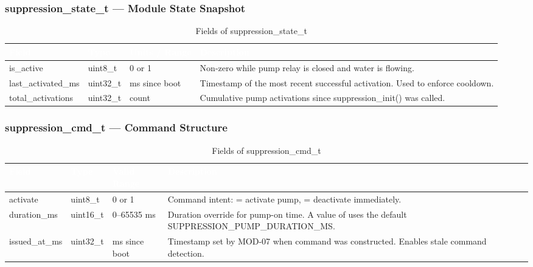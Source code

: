 \documentclass[12pt,a4paper]{article}
\newcommand{\theadtext}[1]{\textcolor{white}{\textbf{#1}}}
\newcommand{\fn}[1]{{\footnotesize\ttfamily #1}}
\begin{document}
\subsubsection{\fn{suppression\_state\_t} --- Module State Snapshot}

\begin{table}[H]
\centering\small
\begin{tabularx}{\textwidth}{L{3.5cm} L{2.5cm} L{2.5cm} X}
\toprule
{}
\theadtext{Field} & \theadtext{Type} & \theadtext{Units / Range} & \theadtext{Description} \\
\midrule
{}   \fn{is\_active}           & \fn{uint8\_t}  & 0 or 1          & Non-zero while pump relay is closed and water is flowing. \\
 \fn{last\_activated\_ms}  & \fn{uint32\_t} & ms since boot   & Timestamp of the most recent successful activation. Used to enforce cooldown. \\
   \fn{total\_activations}   & \fn{uint32\_t} & count           & Cumulative pump activations since \fn{suppression\_init()} was called. \\
\bottomrule
\end{tabularx}
\caption{Fields of \fn{suppression\_state\_t}}
\end{table}

\subsubsection{\fn{suppression\_cmd\_t} --- Command Structure}

\begin{table}[H]
\centering\small
\begin{tabularx}{\textwidth}{L{3.5cm} L{2.5cm} L{2.5cm} X}
\toprule
{}
\theadtext{Field} & \theadtext{Type} & \theadtext{Valid Range} & \theadtext{Description} \\
\midrule
{}   \fn{activate}      & \fn{uint8\_t}  & 0 or 1        & Command intent: \fn{1} = activate pump, \fn{0} = deactivate immediately. \\
 \fn{duration\_ms}  & \fn{uint16\_t} & 0--65535 ms   & Duration override for pump-on time. A value of \fn{0} uses the default \fn{SUPPRESSION\_PUMP\_DURATION\_MS}. \\
   \fn{issued\_at\_ms} & \fn{uint32\_t} & ms since boot & Timestamp set by MOD-07 when command was constructed. Enables stale command detection. \\
\bottomrule
\end{tabularx}
\caption{Fields of \fn{suppression\_cmd\_t}}
\end{table}
\end{document}
